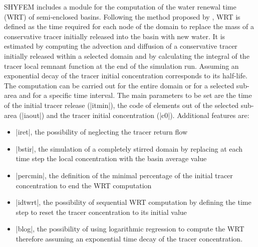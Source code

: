 
%
%
%
%
%
%
%

SHYFEM includes a module for the computation of the water renewal time (WRT) of semi-enclosed basins. 
Following the method proposed by \cite{Cucco2006}, WRT is defined as the time required for 
each node of the domain to replace the mass of a conservative tracer initially released into the basin with 
new water. It is estimated by computing the advection and diffusion of a conservative tracer initially released 
within a selected domain and by calculating the integral of the tracer local remnant function at the end of 
the simulation run. Assuming an exponential decay of the tracer initial concentration corresponds to its half-life. The computation can be carried out for the entire domain or for a selected sub-area and for 
a specific time interval. 
The main parameters to be set are the time of the initial tracer release (|itmin|), the 
code of elements out of the selected sub-area (|iaout|) and the tracer initial concentration (|c0|). Additional 
features are:
\begin{itemize} 
\item |iret|, the possibility of neglecting the tracer return flow
\item |bstir|, the simulation of a completely stirred domain by replacing at each time step the local concentration with the basin average value
\item |percmin|, the definition of the minimal percentage of the initial tracer concentration to end the WRT computation
\item |idtwrt|,  the possibility of sequential WRT computation by defining the time step to reset the tracer concentration to its initial value
\item |blog|, the possibility of using logarithmic regression to compute the WRT therefore assuming an exponential time decay of the tracer concentration.
\end{itemize}